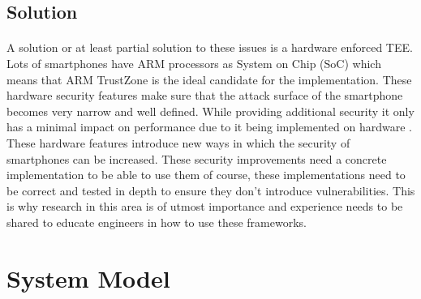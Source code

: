 \documentclass{report}
\begin{document}
\subsection*{Solution}

\paragraph*{}
A solution or at least partial solution to these issues is a hardware enforced TEE. Lots of smartphones have ARM processors as System on Chip (SoC) which means that ARM TrustZone is the ideal candidate for the implementation. These hardware security features make sure that the attack surface of the smartphone becomes very narrow and well defined. While providing additional security it only has a minimal impact on performance due to it being implemented on hardware \cite{AmacherJulien2019Otpo} \cite{HuaZhichao2021Tpcf}. These hardware features introduce new ways in which the security of smartphones can be increased. These security improvements need a concrete implementation to be able to use them of course, these implementations need to be correct and tested in depth to ensure they don't introduce vulnerabilities. This is why research in this area is of utmost importance and experience needs to be shared to educate engineers in how to use these frameworks.

\section{System Model}
\end{document}
